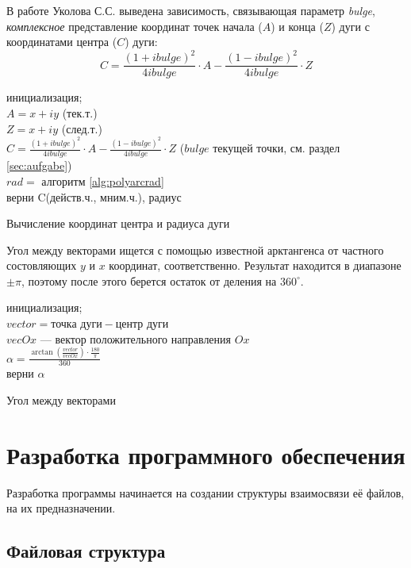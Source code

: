 В работе Уколова С.С. \cite{ukoloff} выведена зависимость, связывающая параметр \textit{bulge},  \textit{комплексное} представление координат точек начала ($A$) и конца ($Z$) дуги с координатами центра ($C$) дуги:
\begin{equation}
	C={\frac{(1+ibulge)^2}{4ibulge}}\cdot A-{\frac{(1-ibulge)^2}{4ibulge}}\cdot Z
	\label{F:arcenter}
\end{equation}

\begin{algorithm}[H]
	\SetAlgoLined
	инициализация;\\
	$A=x+iy$ (тек.т.)\\
	$Z=x+iy$ (след.т.)\\
	$C={\frac{(1+ibulge)^2}{4ibulge}}\cdot A-{\frac{(1-ibulge)^2}{4ibulge}}\cdot Z$ ($bulge$ текущей точки, см. раздел \ref{sec:aufgabe})\\
	$rad=$ алгоритм \ref{alg:polyarcrad}\\
	верни C(действ.ч., мним.ч.), радиус
	\caption{Вычисление координат центра и радиуса дуги}
	\label{alg:polyarc_center_rad}
\end{algorithm}

Угол между векторами ищется с помощью известной арктангенса от частного состовляющих $y$ и $x$ координат, соответственно. Результат находится в диапазоне $\pm\pi$, поэтому после этого берется остаток от деления на $360^\circ$.

\begin{algorithm}[H]
	\SetAlgoLined
	инициализация;\\
	$vector=\text{точка дуги}-\text{центр дуги}$\\
	$vecOx$ --- вектор положительного направления $Ox$\\
	$\alpha=\frac{\arctan(\frac{vector}{vecOx})\cdot\frac{180}{\pi}}{360}$\\
	верни $\alpha$
	\caption{Угол между векторами}
	\label{alg:angle_vectors}
\end{algorithm}


\section{Разработка программного обеспечения}
Разработка программы начинается на создании структуры взаимосвязи её файлов, на их предназначении.

\subsection{Файловая структура}

